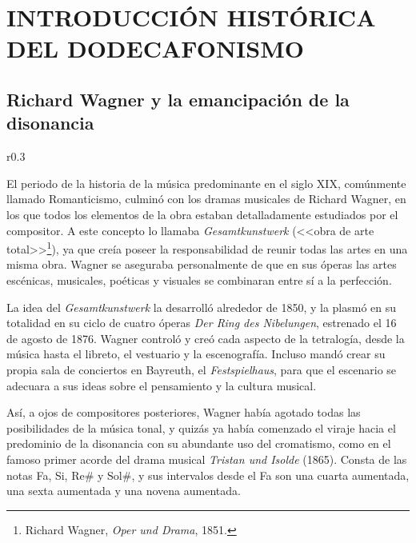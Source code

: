 	\chapter[INTRODUCCIÓN HISTÓRICA DEL DODECAFONISMO]{INTRODUCCIÓN HISTÓRICA DEL DODECAFONISMO}
	\section{Richard Wagner y la emancipación de la disonancia}
		\begin{wrapfigure}{r}{0.3\textwidth}
			\captionsetup{justification=centering, font=footnotesize}
			\vspace{-\bigskipamount}
		\end{wrapfigure}
		El periodo de la historia de la música predominante en el siglo XIX, comúnmente llamado Romanticismo, culminó con los dramas musicales de Richard Wagner, en los que todos los elementos de la obra estaban detalladamente estudiados por el compositor. A este concepto lo llamaba \emph{Gesamtkunstwerk} (<<obra de arte total>>\footnote{Richard Wagner, \emph{Oper und Drama}, 1851.}), ya que creía poseer la responsabilidad de reunir todas las artes en una misma obra. Wagner se aseguraba personalmente de que en sus óperas las artes escénicas, musicales, poéticas y visuales se combinaran entre sí a la perfección.
	
		La idea del \emph{Gesamtkunstwerk} la desarrolló alrededor de 1850, y la plasmó en su totalidad en su ciclo de cuatro óperas \emph{Der Ring des Nibelungen}, estrenado el 16 de agosto de 1876. Wagner controló y creó cada aspecto de la tetralogía, desde la música hasta el libreto, el vestuario y la escenografía. Incluso mandó crear su propia sala de conciertos en Bayreuth, el \emph{Festspielhaus}, para que el escenario se adecuara a sus ideas sobre el pensamiento y la cultura musical.
	
		Así, a ojos de compositores posteriores, Wagner había agotado todas las posibilidades de la música tonal, y quizás ya había comenzado el viraje hacia el predominio de la disonancia con su abundante uso del cromatismo, como en el famoso primer acorde del drama musical \emph{Tristan und Isolde} (1865). Consta de las notas Fa, Si, $\text{Re\#}$ y $\text{Sol\#}$, y sus intervalos desde el Fa son una cuarta aumentada, una sexta aumentada y una novena aumentada.
		
